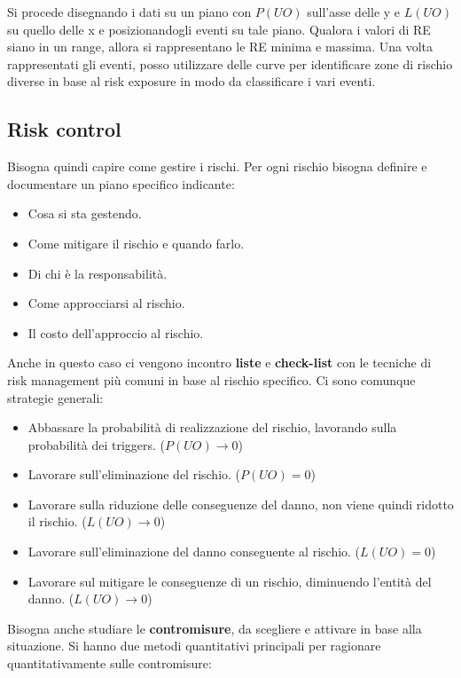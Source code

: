 Si procede disegnando i dati su un piano con $P(UO)$ sull'asse delle y e $L(UO)$
su quello  delle x e posizionandogli eventi su tale piano. Qualora i valori di RE siano
in un range, allora si rappresentano le RE minima e massima. 
Una volta rappresentati gli eventi, posso utilizzare delle curve per
identificare zone di rischio diverse in base al risk exposure in modo da
classificare i vari eventi.

\subsection{Risk control}
Bisogna quindi capire come gestire i rischi. Per ogni rischio bisogna definire e
documentare un piano specifico indicante:
\begin{itemize}
    \item Cosa si sta gestendo.
    \item Come mitigare il rischio e quando farlo.
    \item Di chi è la responsabilità.
    \item Come approcciarsi al rischio.
    \item Il costo dell'approccio al rischio.
\end{itemize}
Anche in questo caso ci vengono incontro \textbf{liste} e \textbf{check-list} con le tecniche di risk
management più comuni in base al rischio specifico. Ci sono comunque strategie generali:
\begin{itemize}
    \item Abbassare la probabilità di realizzazione del rischio, lavorando sulla probabilità 
          dei triggers. ($P(UO) \to 0$)
    \item Lavorare sull'eliminazione del rischio. ($P(UO) = 0$)
    \item Lavorare sulla riduzione delle conseguenze del danno,
          non viene quindi ridotto il rischio. ($L(UO) \to 0$)
    \item Lavorare sull'eliminazione del danno conseguente al rischio. ($L(UO) = 0$)
    \item Lavorare sul mitigare le conseguenze di un rischio, diminuendo l'entità
          del danno. ($L(UO) \to 0$)
\end{itemize}
Bisogna anche studiare le \textbf{contromisure}, da scegliere e attivare in base
alla situazione. Si hanno due metodi quantitativi principali per ragionare
quantitativamente sulle contromisure:
